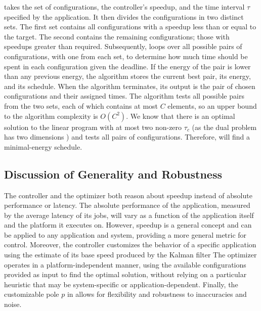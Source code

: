  takes the set of configurations, the controller's speedup, and the time interval $\tau$ specified by the application.
It then divides the configurations in two distinct sets.
The first set contains all configurations with a speedup less than or equal to the target.
The second contains the remaining configurations; \ie those with speedups greater than required.
Subsequently,  loops over all possible pairs of configurations, with one from each set, to determine how much time should be spent in each configuration given the deadline.
If the energy of the pair is lower than any previous energy, the algorithm stores the current best pair, its energy, and its schedule.
When the algorithm terminates, its output is the pair of chosen configurations and their assigned times.
The algorithm tests all possible pairs from the two sets, each of which contains at most $C$ elements, so an upper bound to the algorithm complexity is $O(C^2)$.
We know that there is an optimal solution to the linear program with at most two non-zero $\tau_c$ (as the dual problem has two dimensions \cite{LP}) and  tests all pairs of configurations.
Therefore,  will find a minimal-energy schedule.


\subsection{Discussion of Generality and Robustness}
\label{sec:properties}

The controller and the optimizer both reason about speedup instead of absolute performance or latency.
The absolute performance of the application, measured by the average latency of its jobs, will vary as a function of the application itself and the platform it executes on.
However, speedup is a general concept and can be applied to any application and system, providing a more general metric for control.
Moreover, the controller customizes the behavior of a specific application using the estimate of its base speed produced by the Kalman filter
The optimizer operates in a platform-independent manner, using the available configurations provided as input to find the optimal solution, without relying on a particular heuristic that may be system-specific or application-dependent.
Finally, the customizable pole $p$ in  allows for flexibility and robustness to inaccuracies and noise.

